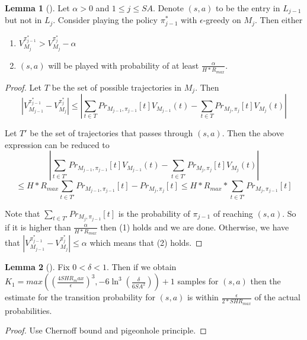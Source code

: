 \documentclass[12pt, letterpaper]{article}
\theoremstyle{definition}
\newtheorem*{lemma}{Lemma}
\theoremstyle{remark}
\begin{document}
\begin{lemma}[]
    Let \(\alpha > 0\) and \(1 \leq j \leq SA\). Denote \((s, a)\) to be the entry in \(L_{j-1}\) but not in \(L_{j}\). Consider playing the policy \(\pi_{j-1}^*\) with \(\epsilon\)-greedy on \(M_j\). Then either

    \begin{enumerate}
        \item \(V^{\pi_{j-1}^*}_{M_j} > V^{\pi_{j}^*}_{M_j} - \alpha\)
        \item \((s, a)\) will be played with probability of at least \(\frac{\alpha}{H*R_{max}}\).
    \end{enumerate}
    
\end{lemma}

\begin{proof}[Proof]
    Let \(T\) be the set of possible trajectories in \(M_j\). Then
    \[|V^{\pi_{j-1}^*}_{M_{j-1}} - V^{\pi_{j}^*}_{M_j}| \leq |\sum_{t \in T} Pr_{M_{j-1}, \pi_{j-1}}[t] V_{M_{j-1}}(t) - \sum_{t \in T} Pr_{M_{j}, \pi_{j}}[t] V_{M_{j}}(t)|\]
    
    Let \(T'\) be the set of trajectories that passes through \((s, a)\). Then the above expression can be reduced to
    \[|\sum_{t \in T'} Pr_{M_{j-1}, \pi_{j-1}}[t] V_{M_{j-1}}(t) - \sum_{t \in T'} Pr_{M_{j}, \pi_{j}}[t] V_{M_{j}}(t)|\]
    \[\leq H*R_{max} \sum_{t \in T'} Pr_{M_{j-1}, \pi_{j-1}}[t] - Pr_{M_{j}, \pi_{j}}[t] \leq H * R_{max} * \sum_{t \in T'} Pr_{M_{j}, \pi_{j-1}}[t]\]

    Note that \(\sum_{t \in T'} Pr_{M_{j}, \pi_{j-1}}[t]\) is the probability of \(\pi_{j-1}\) of reaching \((s, a)\). So if it is higher than \(\frac{\alpha}{H * R_{max}}\) then (1) holds and we are done. Otherwise, we have that \(|V^{\pi_{j-1}^*}_{M_{j-1}} - V^{\pi_{j}^*}_{M_j}| \leq \alpha\) which means that (2) holds.
\end{proof}

\begin{lemma}[]
    Fix \(0 < \delta < 1\). Then if we obtain \(K_1 = max((\frac{4SHR_max}{\epsilon})^3, -6\ln^3(\frac{\delta}{6SA^2})) + 1\) samples for \((s, a)\) then the estimate for the transition probability for \((s, a)\) is within \(\frac{\epsilon}{2*SHR_{max}}\) of the actual probabilities.
\end{lemma}

\begin{proof}[Proof]
    Use Chernoff bound and pigeonhole principle.
\end{proof}
\end{document}
